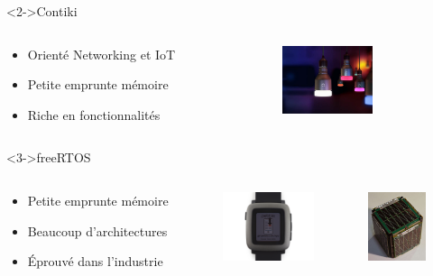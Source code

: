 \begin{frame}
	\begin{block}<2->{Contiki}
		\begin{columns}
		\begin{column}{0.50\textwidth}
		\begin{itemize}
			\item Orienté Networking et IoT
			\item Petite emprunte mémoire
			\item Riche en fonctionnalités
		\end{itemize}
		\end{column}
		\begin{column}{0.30\textwidth}
			\includegraphics[height=2cm]{img/amp.jpg}
		\end{column}
		\end{columns}
	\end{block}
	\begin{block}<3->{freeRTOS}
		\begin{columns}
			\begin{column}{0.50\textwidth}
				\begin{itemize}
					\item Petite emprunte mémoire
					\item Beaucoup d'architectures
					\item Éprouvé dans l'industrie
				\end{itemize}
			\end{column}
			\begin{column}{0.20\textwidth}
				\includegraphics[height=2cm]{img/pt.jpg}
			\end{column}
			\begin{column}{0.20\textwidth}
				\includegraphics[height=2cm]{img/cubesat.jpg}
			\end{column}
		\end{columns}
	\end{block}
\end{frame}

